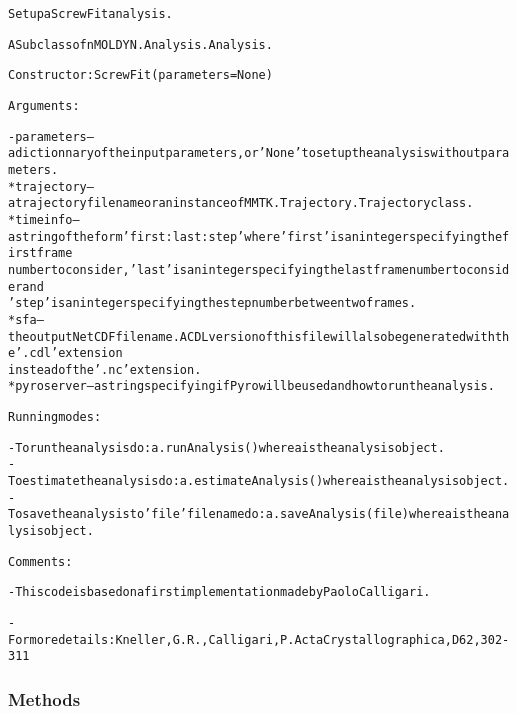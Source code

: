 \begin{alltt}
Set up a Screw Fit analysis.

A Subclass of nMOLDYN.Analysis.Analysis. 

Constructor: ScrewFit({\textbar}parameters{\textbar} = None)

Arguments:

    - {\textbar}parameters{\textbar} -- a dictionnary of the input parameters, or 'None' to set up the analysis without parameters.
        * trajectory  -- a trajectory file name or an instance of MMTK.Trajectory.Trajectory class.
        * timeinfo    -- a string of the form 'first:last:step' where 'first' is an integer specifying the first frame 
                         number to consider, 'last' is an integer specifying the last frame number to consider and 
                         'step' is an integer specifying the step number between two frames.
        * sfa         -- the output NetCDF file name. A CDL version of this file will also be generated with the '.cdl' extension
                         instead of the '.nc' extension.
        * pyroserver  -- a string specifying if Pyro will be used and how to run the analysis.

Running modes:

    - To run the analysis do: a.runAnalysis() where a is the analysis object.
    - To estimate the analysis do: a.estimateAnalysis() where a is the analysis object.
    - To save the analysis to 'file' file name do: a.saveAnalysis(file) where a is the analysis object.
    
Comments:
                                          
    - This code is based on a first implementation made by Paolo Calligari.
    
    - For more details: Kneller, G.R., Calligari, P. Acta Crystallographica , D62, 302-311
\end{alltt}



  \subsubsection{Methods}

    \vspace{0.5ex}

